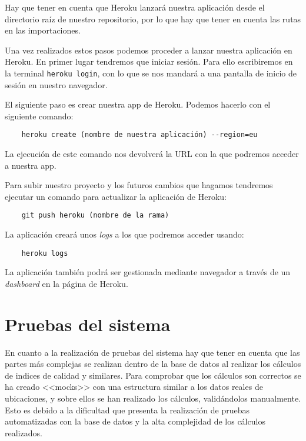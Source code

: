 Hay que tener en cuenta que Heroku lanzará nuestra aplicación desde el directorio raíz de nuestro repositorio, por lo que hay que tener en cuenta las rutas en las importaciones.

Una vez realizados estos pasos podemos proceder a lanzar nuestra aplicación en Heroku. En primer lugar tendremos que iniciar sesión. Para ello escribiremos en la terminal \texttt{heroku login}, con lo que se nos mandará a una pantalla de inicio de sesión en nuestro navegador.

El siguiente paso es crear nuestra app de Heroku. Podemos hacerlo con el siguiente comando:

\begin{verbatim}
	heroku create (nombre de nuestra aplicación) --region=eu
\end{verbatim}

La ejecución de este comando nos devolverá la URL con la que podremos acceder a nuestra app.

Para subir nuestro proyecto y los futuros cambios que hagamos tendremos ejecutar un comando para actualizar la aplicación de Heroku:

\begin{verbatim}
	git push heroku (nombre de la rama)
\end{verbatim}

La aplicación creará unos \textit{logs} a los que podremos acceder usando:
\begin{verbatim}
	heroku logs
\end{verbatim}

La aplicación también podrá ser gestionada mediante navegador a través de un \textit{dashboard} en la página de Heroku.


\section{Pruebas del sistema}

En cuanto a la realización de pruebas del sistema hay que tener en cuenta que las partes más complejas se realizan dentro de la base de datos al realizar los cálculos de indices de calidad y similares. Para comprobar que los cálculos son correctos se ha creado <<mocks>> con una estructura similar a los datos reales de ubicaciones, y sobre ellos se han realizado los cálculos, validándolos manualmente. Esto es debido a la dificultad que presenta la realización de pruebas automatizadas con la base de datos y la alta complejidad de los cálculos realizados.
